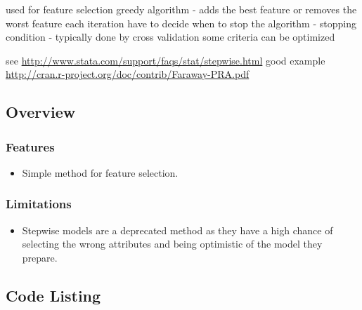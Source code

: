 used for feature selection
greedy algorithm - adds the best feature or removes the worst feature each iteration
have to decide when to stop the algorithm - stopping condition - typically done by cross validation
some criteria can be optimized

see \url{http://www.stata.com/support/faqs/stat/stepwise.html}
good example \url{http://cran.r-project.org/doc/contrib/Faraway-PRA.pdf}

\subsection{Overview}

\subsubsection{Features}

\begin{itemize}
	\item Simple method for feature selection.
\end{itemize}

\subsubsection{Limitations}

\begin{itemize}
	\item Stepwise models are a deprecated method as they have a high chance of selecting the wrong attributes and being optimistic of the model they prepare.
\end{itemize}



\subsection{Code Listing}





